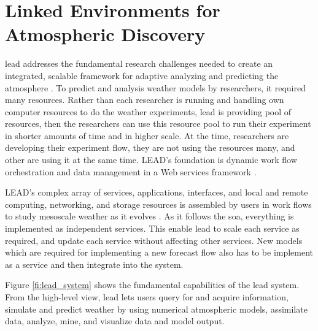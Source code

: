 \section{Linked Environments for Atmospheric Discovery}

\acrfull{lead} addresses the fundamental research challenges needed to create an integrated, scalable framework for adaptive analyzing and predicting the atmosphere \cite{Droegemeier2005Service-OrientedWeather}. To predict and analysis weather models by researchers, it required many resources. Rather than each researcher is running and handling own computer resources to do the weather experiments, \acrshort{lead} is providing pool of resources, then the researchers can use this resource pool to run their experiment in shorter amounts of time and in higher scale. At the time, researchers are developing their experiment flow, they are not using the resources many, and other are using it at the same time. LEAD’s foundation is dynamic work flow orchestration and data management in a Web services framework \cite{Droegemeier2005Service-OrientedWeather}.

LEAD's complex array of services, applications, interfaces, and local and remote computing, networking, and storage resources is assembled by users in work flows to study mesoscale weather as it evolves \cite{Droegemeier2005Service-OrientedWeather}. As it follows the \acrshort{soa}, everything is implemented as independent services. This enable \acrshort{lead} to scale each service as required, and update each service without affecting other services. New models which are required for implementing a new forecast flow also has to be implement as a service and then integrate into the system.

Figure \ref{fi:lead_system} shows the fundamental capabilities of the \acrshort{lead} system. From the high-level view, \acrshort{lead} lets users query for and acquire information, simulate and predict weather by using numerical atmospheric models, assimilate data, analyze, mine, and visualize data and model output.

